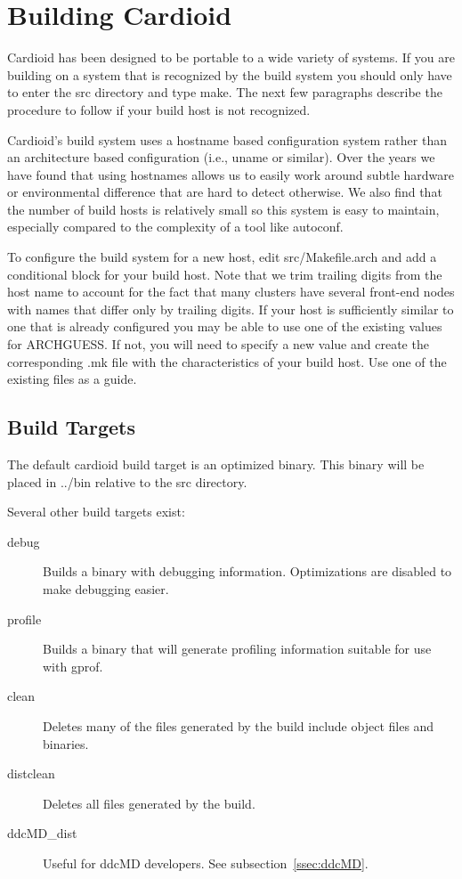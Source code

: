 \documentclass{article}
\begin{document}
\def\path#1{#1}

\long{}

\section{Building Cardioid}

Cardioid has been designed to be portable to a wide variety of systems.
If you are building on a system that is recognized by the build system
you should only have to enter the src directory and type make.  The next
few paragraphs describe the procedure to follow if your build host is
not recognized.

Cardioid's build system uses a hostname based configuration system
rather than an architecture based configuration (i.e., uname or
similar).  Over the years we have found that using hostnames allows us
to easily work around subtle hardware or environmental difference that
are hard to detect otherwise.  We also find that the number of build
hosts is relatively small so this system is easy to maintain, especially
compared to the complexity of a tool like autoconf.

To configure the build system for a new host, edit
\path{src/Makefile.arch} and add a conditional block for your build
host.  Note that we trim trailing digits from the host name to account
for the fact that many clusters have several front-end nodes with names
that differ only by trailing digits.  If your host is sufficiently
similar to one that is already configured you may be able to use one of
the existing values for ARCHGUESS.  If not, you will need to specify a
new value and create the corresponding \path{.mk} file with the
characteristics of your build host.  Use one of the existing files as a
guide.

\subsection{Build Targets}

The default cardioid build target is an optimized binary.  This binary
will be placed in \path{../bin} relative to the \path{src} directory.

Several other build targets exist:
\par\noindent
\begin{description}
\item[debug]  Builds a binary with debugging information.  Optimizations are
  disabled to make debugging easier.
\item[profile] Builds a binary that will generate profiling information
  suitable for use with gprof.
\item[clean]  Deletes many of the files generated by the build include
  object files and binaries.
\item[distclean] Deletes all files generated by the build.
\item[ddcMD\_dist] Useful for ddcMD developers.  See
  subsection~\ref{ssec:ddcMD}.
\end{description}
\end{document}
